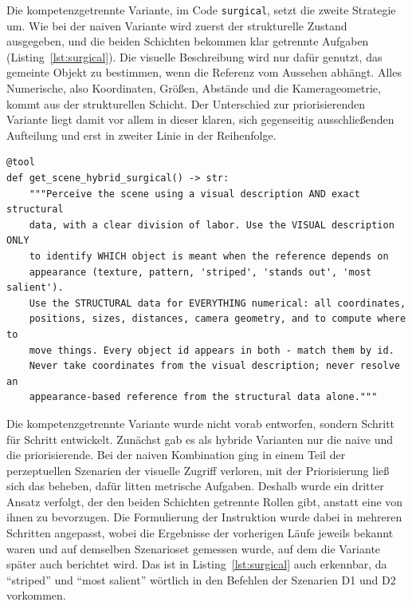 Die kompetenzgetrennte Variante, im Code \texttt{surgical}, setzt die zweite Strategie um.
Wie bei der naiven Variante wird zuerst der strukturelle Zustand ausgegeben, und die beiden Schichten bekommen klar getrennte Aufgaben (Listing~\ref{lst:surgical}).
Die visuelle Beschreibung wird nur dafür genutzt, das gemeinte Objekt zu bestimmen, wenn die Referenz vom Aussehen abhängt.
Alles Numerische, also Koordinaten, Größen, Abstände und die Kamerageometrie, kommt aus der strukturellen Schicht.
Der Unterschied zur priorisierenden Variante liegt damit vor allem in dieser klaren, sich gegenseitig ausschließenden Aufteilung und erst in zweiter Linie in der Reihenfolge.

\begin{listing}[htbp]
\begin{verbatim}
@tool
def get_scene_hybrid_surgical() -> str:
    """Perceive the scene using a visual description AND exact structural
    data, with a clear division of labor. Use the VISUAL description ONLY
    to identify WHICH object is meant when the reference depends on
    appearance (texture, pattern, 'striped', 'stands out', 'most salient').
    Use the STRUCTURAL data for EVERYTHING numerical: all coordinates,
    positions, sizes, distances, camera geometry, and to compute where to
    move things. Every object id appears in both - match them by id.
    Never take coordinates from the visual description; never resolve an
    appearance-based reference from the structural data alone."""
\end{verbatim}
\caption{Wahrnehmungswerkzeug der kompetenzgetrennten Variante.}
\label{lst:surgical}
\end{listing}

Die kompetenzgetrennte Variante wurde nicht vorab entworfen, sondern Schritt für Schritt entwickelt.
Zunächst gab es als hybride Varianten nur die naive und die priorisierende.
Bei der naiven Kombination ging in einem Teil der perzeptuellen Szenarien der visuelle Zugriff verloren, mit der Priorisierung ließ sich das beheben, dafür litten metrische Aufgaben.
Deshalb wurde ein dritter Ansatz verfolgt, der den beiden Schichten getrennte Rollen gibt, anstatt eine von ihnen zu bevorzugen.
Die Formulierung der Instruktion wurde dabei in mehreren Schritten angepasst, wobei die Ergebnisse der vorherigen Läufe jeweils bekannt waren und auf demselben Szenarioset gemessen wurde, auf dem die Variante später auch berichtet wird.
Das ist in Listing~\ref{lst:surgical} auch erkennbar, da \enquote{striped} und \enquote{most salient} wörtlich in den Befehlen der Szenarien D1 und D2 vorkommen.


